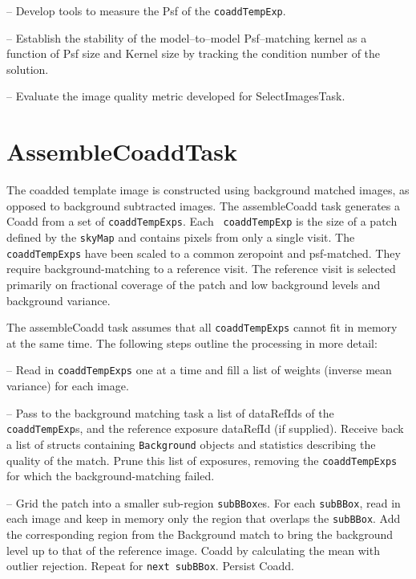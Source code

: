 \documentclass[prd, nofootinbib, floatfix, 11pt,tightenlines,times]{article}
\begin{document}
-- Develop tools to measure the Psf of the {\tt coaddTempExp}.

-- Establish the stability of the model--to--model Psf--matching
kernel as a function of Psf size and Kernel size by tracking
the condition number of the solution.

-- Evaluate the image quality metric developed for SelectImagesTask.


\section{AssembleCoaddTask} 

The coadded template image is constructed using background matched
images, as opposed to background subtracted images. The assembleCoadd
task generates a Coadd from a set of {\tt coaddTempExps}.  Each {\tt
  coaddTempExp} is the size of a patch defined by the {\tt skyMap} and
contains pixels from only a single visit.  The {\tt coaddTempExps}
have been scaled to a common zeropoint and psf-matched.  They require
background-matching to a reference visit. The reference visit is
selected primarily on fractional coverage of the patch and low
background levels and background variance.

The assembleCoadd task assumes that all {\tt coaddTempExps} cannot fit
in memory at the same time. The following steps outline the processing
in more detail:

-- Read in {\tt coaddTempExps} one at a time and fill a list of
weights (inverse mean variance) for each image.

-- Pass to the background matching task a list of dataRefIds of the
{\tt coaddTempExp}s, and the reference exposure dataRefId (if
supplied).  Receive back a list of structs containing {\tt Background}
objects and statistics describing the quality of the match.  Prune
this list of exposures, removing the {\tt coaddTempExps} for which the
background-matching failed.  

-- Grid the patch into a smaller sub-region {\tt subBBox}es. For each
{\tt subBBox}, read in each image and keep in memory only the region
that overlaps the {\tt subBBox}. Add the corresponding region from the
Background match to bring the background level up to that of the
reference image.  Coadd by calculating the mean with outlier
rejection.  Repeat for {\tt next subBBox}.  Persist Coadd.
\end{document}
